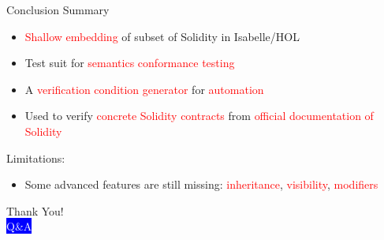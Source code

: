 \documentclass[aspectratio=169]{beamer}
\begin{document}
\begin{frame}{Conclusion}
Summary
\begin{itemize}
	\item \textcolor{red}{Shallow embedding} of subset of Solidity in Isabelle/HOL
	\item Test suit for  \textcolor{red}{semantics conformance testing}
	\item A \textcolor{red}{verification condition generator} for \textcolor{red}{automation}
	\item Used to verify \textcolor{red}{concrete Solidity contracts} from \textcolor{red}{official documentation of Solidity}
\end{itemize}
\bigskip

Limitations: 
\begin{itemize}
	\item Some advanced features are still missing: \textcolor{red}{inheritance}, \textcolor{red}{visibility}, \textcolor{red}{modifiers}
\end{itemize}
\end{frame}
\begin{frame}{}
	\begin{center}
{\fontsize{40}{50}\selectfont Thank You!}\\
\vspace{0.5in}
{\fontsize{30}{40}\selectfont \textcolor{white}{\colorbox{blue}{Q\&A}}}\\
\end{center}
\end{frame}
%
\end{document}
